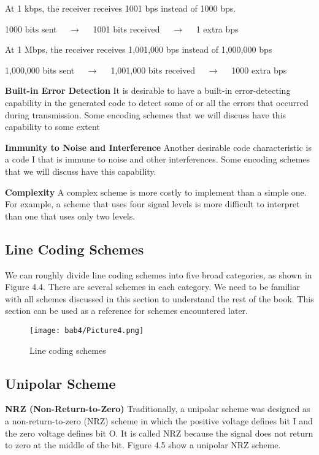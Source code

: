 \begin{solution}
  At 1 kbps, the receiver receives 1001 bps instead of 1000 bps.

  1000 bits sent $\quad \rightarrow \quad$ 1001 bits received $\quad \rightarrow \quad$ 1 extra bps

  \noindent At 1 Mbps, the receiver receives 1,001,000 bps instead of 1,000,000 bps

  1,000,000 bits sent $\quad \rightarrow \quad$ 1,001,000 bits received $\quad \rightarrow \quad$ 1000 extra bps
\end{solution}

\vspace{6pt}

\textbf{Built-in Error Detection} It is desirable to have a built-in error-detecting capability in the generated code to detect some of or all the errors that occurred during transmission. Some encoding schemes that we will discuss have this capability to some extent

\textbf{Immunity to Noise and Interference} Another desirable code characteristic is a code I that is immune to noise and other interferences. Some encoding schemes that we will discuss have this capability. 

\textbf{Complexity} A complex scheme is more costly to implement than a simple one. For example, a scheme that uses four signal levels is more difficult to interpret than one that uses only two levels.

\subsection{Line Coding Schemes}
We can roughly divide line coding schemes into five broad categories, as shown in Figure 4.4. There are several schemes in each category. We need to be familiar with all schemes discussed in this section to understand the rest of the book. This section can be used as a reference for schemes encountered later.

\begin{figure}
  \centering
  \texttt{[image: bab4/Picture4.png]}
  \caption{Line coding schemes}
  \label{fig4:4}
\end{figure}

\subsection*{Unipolar Scheme}
\textbf{NRZ (Non-Return-to-Zero)} Traditionally, a unipolar scheme was designed as a non-return-to-zero (NRZ) scheme in which the positive voltage defines bit I and the zero voltage defines bit O. It is called NRZ because the signal does not return to zero at the middle of the bit. Figure 4.5 show a unipolar NRZ scheme.


